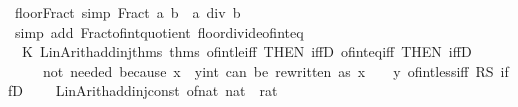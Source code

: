 \begin{isabellebody}
\ floor{\isacharunderscore}{\kern0pt}Fract\ {\isacharbrackleft}{\kern0pt}simp{\isacharbrackright}{\kern0pt}{\isacharcolon}{\kern0pt}\ {\isachardoublequoteopen}{\isasymlfloor}Fract\ a\ b{\isasymrfloor}\ {\isacharequal}{\kern0pt}\ a\ div\ b{\isachardoublequoteclose}\isanewline
%
\isadelimproof
\ \ %
\endisadelimproof
%
\isatagproof
{}\isamarkupfalse%
\ {\isacharparenleft}{\kern0pt}simp\ add{\isacharcolon}{\kern0pt}\ Fract{\isacharunderscore}{\kern0pt}of{\isacharunderscore}{\kern0pt}int{\isacharunderscore}{\kern0pt}quotient\ floor{\isacharunderscore}{\kern0pt}divide{\isacharunderscore}{\kern0pt}of{\isacharunderscore}{\kern0pt}int{\isacharunderscore}{\kern0pt}eq{\isacharparenright}{\kern0pt}%
\endisatagproof
{\isafoldproof}%
%
\isadelimproof
%
\endisadelimproof
%
\isadelimdocument
%
\endisadelimdocument
%
\isatagdocument
%
\isamarkuptrue%
%
\endisatagdocument
{\isafolddocument}%
%
\isadelimdocument
%
\endisadelimdocument
%
\isadelimML
%
\endisadelimML
%
\isatagML
{}\isamarkupfalse%
\ {\isacartoucheopen}\isanewline
\ \ K\ {\isacharparenleft}{\kern0pt}Lin{\isacharunderscore}{\kern0pt}Arith{\isachardot}{\kern0pt}add{\isacharunderscore}{\kern0pt}inj{\isacharunderscore}{\kern0pt}thms\ {\isacharat}{\kern0pt}{\isacharbraceleft}{\kern0pt}thms\ of{\isacharunderscore}{\kern0pt}int{\isacharunderscore}{\kern0pt}le{\isacharunderscore}{\kern0pt}iff\ {\isacharbrackleft}{\kern0pt}THEN\ iffD{}{\isacharbrackright}{\kern0pt}\ of{\isacharunderscore}{\kern0pt}int{\isacharunderscore}{\kern0pt}eq{\isacharunderscore}{\kern0pt}iff\ {\isacharbrackleft}{\kern0pt}THEN\ iffD{}{\isacharbrackright}{\kern0pt}{\isacharbraceright}{\kern0pt}\isanewline
\ \ \ \ {\isacharparenleft}{\kern0pt}{\isacharasterisk}{\kern0pt}\ not\ needed\ because\ x\ {\isacharless}{\kern0pt}\ {\isacharparenleft}{\kern0pt}y{\isacharcolon}{\kern0pt}{\isacharcolon}{\kern0pt}int{\isacharparenright}{\kern0pt}\ can\ be\ rewritten\ as\ x\ {\isacharplus}{\kern0pt}\ {}\ {\isacharless}{\kern0pt}{\isacharequal}{\kern0pt}\ y{\isacharcolon}{\kern0pt}\ of{\isacharunderscore}{\kern0pt}int{\isacharunderscore}{\kern0pt}less{\isacharunderscore}{\kern0pt}iff\ RS\ iffD{}\ {\isacharasterisk}{\kern0pt}{\isacharparenright}{\kern0pt}\isanewline
\ \ {\isacharhash}{\kern0pt}{\isachargreater}{\kern0pt}\ Lin{\isacharunderscore}{\kern0pt}Arith{\isachardot}{\kern0pt}add{\isacharunderscore}{\kern0pt}inj{\isacharunderscore}{\kern0pt}const\ {\isacharparenleft}{\kern0pt}\isactrlconstUNDERSCOREname {\isasymopen}of{\isacharunderscore}{\kern0pt}nat{\isasymclose}{\isacharcomma}{\kern0pt}\ \isactrltyp {\isasymopen}nat\ {\isasymRightarrow}\ rat{\isasymclose}{\isacharparenright}{\kern0pt}\isanewline

\end{isabellebody}
